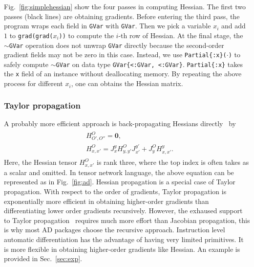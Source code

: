 \documentclass[aps,twocolumn,longbibliography,english,superscriptaddress]{revtex4-1}
\newcommand{\<}{\langle}
\renewcommand{\>}{\rangle}
\newcommand{\Fig}[1]{Fig.~\ref{#1}}
\newcommand{\Sec}[1]{Sec.~\ref{#1}}
\theoremstyle{definition}\newtheorem{definition}{\textit{Definition}}
\begin{document}
\Fig{fig:simplehessian} show the four passes in computing Hessian. The first two passes (black lines) are obtaining gradients. Before entering the third pass, the program wraps each field in \texttt{GVar} with \texttt{GVar}. Then we pick a variable $x_i$ and add $1$ to \texttt{grad(grad($x_i$))} to compute the $i$-th row of Hessian. At the final stage, the \texttt{$\sim$GVar} operation does not unwrap \texttt{GVar} directly because the second-order gradient fields may not be zero in this case. Instead, we use \texttt{Partial\{:x\}($\cdot$)} to safely compute \texttt{$\sim$GVar} on data type \texttt{GVar\{<:GVar, <:GVar\}}. \texttt{Partial\{:x\}} takes the \texttt{x} field of an instance without deallocating memory. By repeating the above process for different $x_i$, one can obtains the Hessian matrix.

\subsubsection{Taylor propagation}\label{sec:taylor}
A probably more efficient approach is back-propagating Hessians directly~\cite{Martens2012} by
\begin{align}
    \begin{split}
        &H^{O}_{O',O''} = \mathbf{0},\\
        &H^{O}_{x,x'} = J^{y}_{x} H^{O}_{y, y'} J^{y'}_{x'} + J^{O}_{y} H^{y}_{x, x'}.
    \end{split}
\end{align}
Here, the Hessian tensor $H^O_{x,x'}$ is rank three, where the top index is often takes as a scalar and omitted.
In tensor network language, the above equation can be represented as in \Fig{fig:ad}.
Hessian propagation is a special case of Taylor propagation.
With respect to the order of gradients, Taylor propagation is exponentially more efficient in obtaining higher-order gradients than differentiating lower order gradients recursively. %
However, the exhaused support to Taylor propagation~\cite{Bettencourt2019} requires much more effort than Jacobian propagation, this is why most AD packages choose the recursive approach.
Instruction level automatic differentiation has the advantage of having very limited primitives. It is more flexible in obtaining higher-order gradients like Hessian.
An example is provided in \Sec{sec:exp}.
\end{document}
